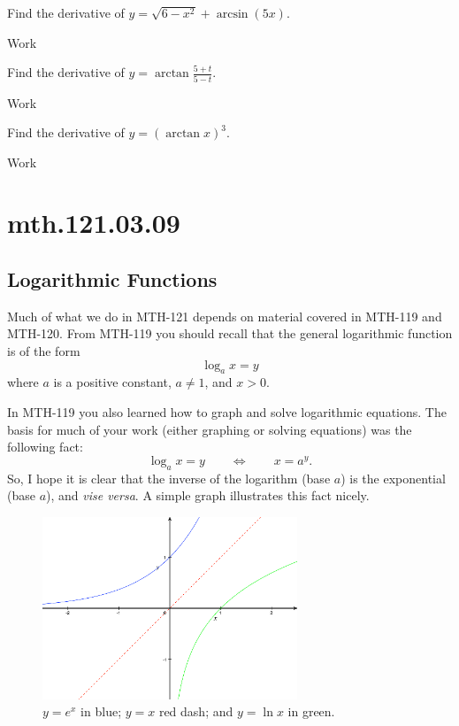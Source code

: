 \documentclass[12pt,addpoints, answers, fleqn]{exam}
\begin{document}
\begin{teacher}
\begin{questions}
Find the derivative of $y = \sqrt{6 - x^2} + \arcsin \left( 5x \right)$.
\begin{solution}
Work
\end{solution}

\question 	%

Find the derivative of $y = \arctan \displaystyle \frac{5+t}{5-t}$.
\begin{solution}
Work
\end{solution}

\question 	%

Find the derivative of $y = \left(\arctan x\right)^3$.
\begin{solution}
Work
\end{solution}

\end{questions}
\end{teacher}
\vfill
\pagebreak

\section{mth.121.03.09}
\subsection{Logarithmic Functions}

Much of what we do in MTH-121 depends on material covered in MTH-119 and MTH-120. From MTH-119 you should recall that the general logarithmic function is of the form
\[
\log_a x = y
\]
where $a$ is a positive constant, $a \neq 1$, and $x > 0$.



In MTH-119 you also learned how to graph and solve logarithmic equations. The basis for much of your work (either graphing or solving equations) was the following fact:
\[
\log_a x = y \qquad \Leftrightarrow \qquad x = a^y.
\]
So, I hope it is clear that the inverse of the logarithm (base $a$) is the exponential (base $a$), and \emph{vise versa}. A simple graph illustrates this fact nicely.
\begin{figure}[htbp] %
   \centering
   \includegraphics[width=3in]{./graphics/graph1701.pdf} 
   \caption{$y=e^x$ in blue; $y = x$ red dash; and $y=\ln x$ in green.}
   \label{fig:graph1701}
\end{figure}
\end{document}
